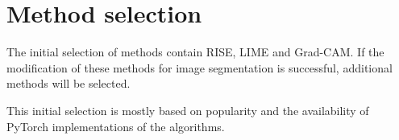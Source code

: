 \section{Method selection}
The initial selection of methods contain RISE, LIME and Grad-CAM. If the modification of these methods for image segmentation is successful, additional methods will be selected.

This initial selection is mostly based on popularity and the availability of PyTorch implementations of the algorithms.